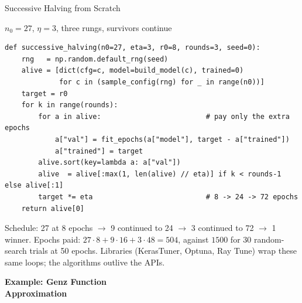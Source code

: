 \documentclass[aspectratio=169,11pt]{beamer}
\begin{document}
\begin{frame}[fragile]{Successive Halving from Scratch}
\vspace{-0.15cm}
\begin{block}{$n_0=27$, $\eta=3$, three rungs, survivors continue}
{\scriptsize
\begin{verbatim}
def successive_halving(n0=27, eta=3, r0=8, rounds=3, seed=0):
    rng   = np.random.default_rng(seed)
    alive = [dict(cfg=c, model=build_model(c), trained=0)
             for c in (sample_config(rng) for _ in range(n0))]
    target = r0
    for k in range(rounds):
        for a in alive:                         # pay only the extra epochs
            a["val"] = fit_epochs(a["model"], target - a["trained"])
            a["trained"] = target
        alive.sort(key=lambda a: a["val"])
        alive  = alive[:max(1, len(alive) // eta)] if k < rounds-1 else alive[:1]
        target *= eta                           # 8 -> 24 -> 72 epochs
    return alive[0]
\end{verbatim}
}
\end{block}
{\scriptsize Schedule: 27 at 8 epochs $\to$ 9 continued to 24 $\to$ 3 continued to 72 $\to$ 1 winner. Epochs paid: $27\cdot 8 + 9\cdot 16 + 3\cdot 48 = 504$, against $1500$ for 30 random-search trials at 50 epochs. Libraries (KerasTuner, Optuna, Ray Tune) wrap these same loops; the algorithms outlive the APIs.}
\end{frame}


{
\begin{frame}[plain,c]
\begin{center}
{\Huge\bfseries Example: Genz Function}\\[0.3cm]
{\Large\bfseries Approximation}
\end{center}
\end{frame}
}
\end{document}
